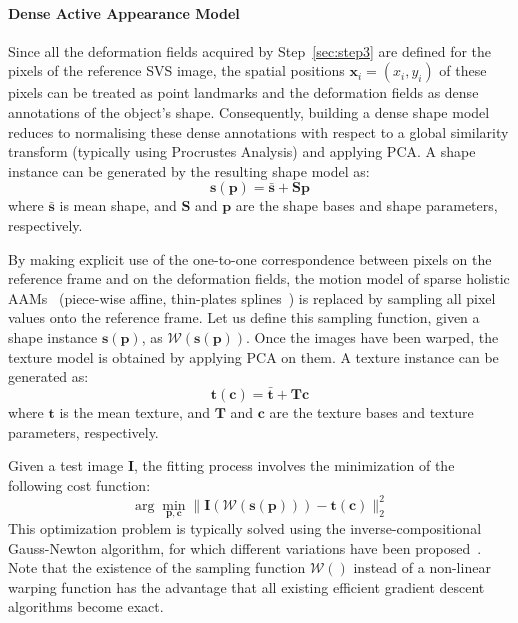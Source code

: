 \paragraph{Dense Active Appearance Model} Since all the deformation fields acquired by Step~\ref{sec:step3} are defined for the pixels of the reference SVS image, the spatial positions $\bm{x}_i=(x_i, y_i)$ of these pixels can be treated as point landmarks and the deformation fields as dense annotations of the object's shape. Consequently, building a dense shape model reduces to normalising these dense annotations with respect to a global similarity transform (typically using Procrustes Analysis) and applying PCA. A shape instance can be generated by the resulting shape model as:
\begin{equation}
    \bm{s}(\bm{p}) = \bm{\bar{s}} + \bm{S} \bm{p}
    \label{eq:shape_model}
\end{equation}
where $\bm{\bar{s}}$ is mean shape, and $\bm{S}$ and $\bm{p}$ are the shape bases and shape parameters, respectively.

By making explicit use of the one-to-one correspondence between pixels on the reference frame and on the deformation fields, the motion model of sparse holistic AAMs~\cite{Cootes2001, Matthews2004} (piece-wise affine, thin-plates splines~\cite{Bookstein1989}) is replaced by sampling all pixel values onto the reference frame. Let us define this sampling function, given a shape instance $\bm{s}(\bm{p})$, as $\mathcal{W}(\bm{s}(\bm{p}))$. Once the images have been warped, the texture model is obtained by applying PCA on them. A texture instance can be generated as:
\begin{equation}
    \bm{t}(\bm{c}) = \bm{\bar{t}} + \bm{T} \bm{c}
	\label{eq:tex_model}
\end{equation}
where $\bm{t}$ is the mean texture, and $\bm{T}$ and $\bm{c}$ are the texture bases and texture parameters, respectively.

Given a test image $\mathbf{I}$, the fitting process involves the minimization of the following cost function:
\begin{equation}
    \arg\min_{\bm{p}, \bm{c}}\|\bm{I}(\mathcal{W}(\bm{s}(\bm{p}))) - \bm{t}(\bm{c})\|_2^2
	\label{eq:aam_cost}
\end{equation}
This optimization problem is typically solved using the inverse-compositional Gauss-Newton algorithm, for which different variations have been proposed~\cite{Matthews2004, Papandreou2008, Amberg2009, Tzimiropoulos2013, Alabort2014}. Note that the existence of the sampling function $\mathcal{W}()$ instead of a non-linear warping function has the advantage that all existing efficient gradient descent algorithms become exact.

